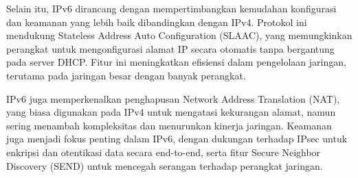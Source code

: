 Selain itu, IPv6 dirancang dengan mempertimbangkan kemudahan konfigurasi dan keamanan yang lebih baik dibandingkan dengan IPv4. Protokol ini mendukung Stateless Address Auto Configuration (SLAAC), yang memungkinkan perangkat untuk mengonfigurasi alamat IP secara otomatis tanpa bergantung pada server DHCP. Fitur ini meningkatkan efisiensi dalam pengelolaan jaringan, terutama pada jaringan besar dengan banyak perangkat.

IPv6 juga memperkenalkan penghapusan Network Address Translation (NAT), yang biasa digunakan pada IPv4 untuk mengatasi kekurangan alamat, namun sering menambah kompleksitas dan menurunkan kinerja jaringan. Keamanan juga menjadi fokus penting dalam IPv6, dengan dukungan terhadap IPsec untuk enkripsi dan otentikasi data secara end-to-end, serta fitur Secure Neighbor Discovery (SEND) untuk mencegah serangan terhadap perangkat jaringan.

